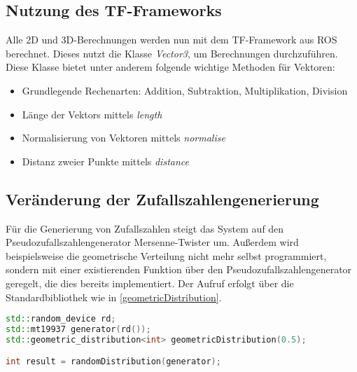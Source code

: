 
\subsection{Nutzung des TF-Frameworks}

Alle 2D und 3D-Berechnungen werden nun mit dem TF-Framework aus \ac{ROS} berechnet. Dieses nutzt die Klasse \emph{Vector3}, um Berechnungen durchzuführen. Diese Klasse bietet unter anderem folgende wichtige Methoden für Vektoren:
\begin{itemize}
  \item Grundlegende Rechenarten: Addition, Subtraktion, Multiplikation, Division
  \item Länge der Vektors mittels \emph{length}
  \item Normalisierung von Vektoren mittels \emph{normalise}
  \item Distanz zweier Punkte mittels \emph{distance}
\end{itemize}

\subsection{Veränderung der Zufallszahlengenerierung}

Für die Generierung von Zufallszahlen steigt das System auf den Pseudozufallszahlengenerator Mersenne-Twister \autocite{matsumoto1998mersenne} um. Außerdem wird beispielsweise die geometrische Verteilung nicht mehr selbst programmiert, sondern mit einer existierenden Funktion über den Pseudozufallszahlengenerator geregelt, die dies bereits implementiert. Der Aufruf erfolgt über die Standardbibliothek wie in \autoref{geometricDistribution}.

\begin{lstlisting}[label={geometricDistribution}, language=C++, caption={Geometrische Verteilung mittels C++}]
std::random_device rd;
std::mt19937 generator(rd());
std::geometric_distribution<int> geometricDistribution(0.5);

int result = randomDistribution(generator);
\end{lstlisting}